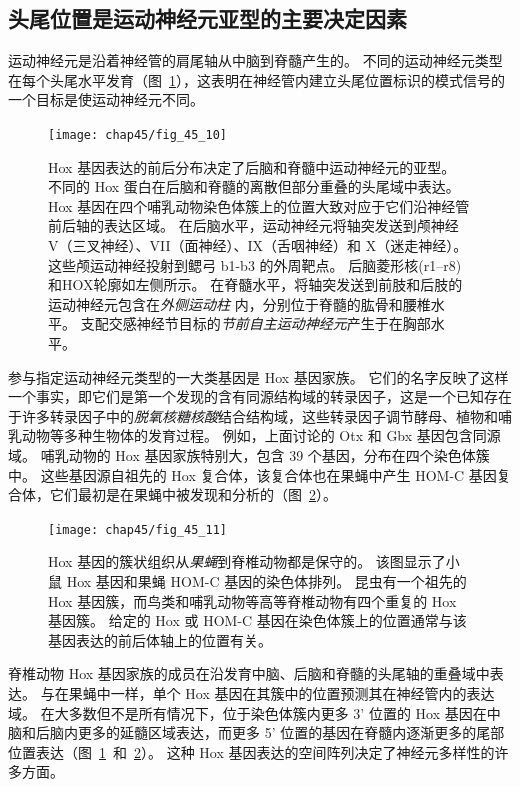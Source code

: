 \subsection{头尾位置是运动神经元亚型的主要决定因素}

运动神经元是沿着神经管的肩尾轴从中脑到脊髓产生的。
不同的运动神经元类型在每个头尾水平发育（图~\ref{fig:45_10}），这表明在神经管内建立头尾位置标识的模式信号的一个目标是使运动神经元不同。


\begin{figure}[htbp]
	\centering
	\texttt{[image: chap45/fig\_45\_10]}
	\caption{Hox 基因表达的前后分布决定了后脑和脊髓中运动神经元的亚型。
		不同的 Hox 蛋白在后脑和脊髓的离散但部分重叠的头尾域中表达。
		Hox 基因在四个哺乳动物染色体簇上的位置大致对应于它们沿神经管前后轴的表达区域。
		在后脑水平，运动神经元将轴突发送到颅神经 V（三叉神经）、VII（面神经）、IX（舌咽神经）和 X（迷走神经）。
		这些颅运动神经投射到鳃弓 b1-b3 的外周靶点。
		后脑菱形核(r1–r8)和HOX轮廓如左侧所示。
		在脊髓水平，将轴突发送到前肢和后肢的运动神经元包含在\textit{外侧运动柱} 内，分别位于脊髓的肱骨和腰椎水平。
		支配交感神经节目标的\textit{节前自主运动神经元}产生于在胸部水平\cite{kiecker2005compartments}。 }
	\label{fig:45_10}
\end{figure}


参与指定运动神经元类型的一大类基因是 Hox 基因家族。
它们的名字反映了这样一个事实，即它们是第一个发现的含有同源结构域的转录因子，这是一个已知存在于许多转录因子中的\textit{脱氧核糖核酸}结合结构域，这些转录因子调节酵母、植物和哺乳动物等多种生物体的发育过程。
例如，上面讨论的 Otx 和 Gbx 基因包含同源域。
哺乳动物的 Hox 基因家族特别大，包含 39 个基因，分布在四个染色体簇中。
这些基因源自祖先的 Hox 复合体，该复合体也在果蝇中产生 HOM-C 基因复合体，它们最初是在果蝇中被发现和分析的（图~\ref{fig:45_11}）。


\begin{figure}[htbp]
	\centering
	\texttt{[image: chap45/fig\_45\_11]}
	\caption{Hox 基因的簇状组织从\textit{果蝇}到脊椎动物都是保守的。
		该图显示了小鼠 Hox 基因和果蝇 HOM-C 基因的染色体排列。
		昆虫有一个祖先的 Hox 基因簇，而鸟类和哺乳动物等高等脊椎动物有四个重复的 Hox 基因簇。
		给定的 Hox 或 HOM-C 基因在染色体簇上的位置通常与该基因表达的前后体轴上的位置有关\cite{wolpert2015principles}。 }
	\label{fig:45_11}
\end{figure}


脊椎动物 Hox 基因家族的成员在沿发育中脑、后脑和脊髓的头尾轴的重叠域中表达。
与在果蝇中一样，单个 Hox 基因在其簇中的位置预测其在神经管内的表达域。
在大多数但不是所有情况下，位于染色体簇内更多 3' 位置的 Hox 基因在中脑和后脑内更多的延髓区域表达，而更多 5' 位置的基因在脊髓内逐渐更多的尾部位置表达（图~\ref{fig:45_10}~和~\ref{fig:45_11}）。
这种 Hox 基因表达的空间阵列决定了神经元多样性的许多方面。


